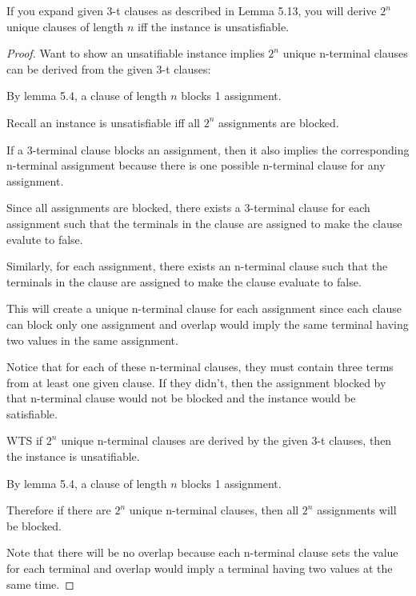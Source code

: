 \documentclass[manuscript]{acmart}
\begin{document}
    \begin{lemma}
        If you expand given 3-t clauses as described in Lemma 5.13, you will
        derive $2^n$ unique clauses of length $n$ iff the instance is unsatisfiable.
    \end{lemma}
    \begin{proof}
        Want to show an unsatifiable instance implies $2^n$ unique n-terminal
        clauses can be derived from the given 3-t clauses:

        By lemma 5.4, a clause of length $n$ blocks 1 assignment. 

        Recall an instance is unsatisfiable iff all $2^n$ assignments are
        blocked.

        If a 3-terminal clause blocks an assignment, then it also implies
        the corresponding n-terminal assignment because there is one possible
        n-terminal clause for any assignment.

        Since all assignments are blocked, there exists a 3-terminal clause for each
        assignment such that the terminals in the clause are assigned to make
        the clause evalute to false.

        Similarly, for each assignment, there exists an n-terminal clause such
        that the terminals in the clause are assigned to make the clause evaluate
        to false.

        This will create a unique n-terminal clause for each assignment since
        each clause can block only one assignment and overlap would imply
        the same terminal having two values in the same assignment.

        Notice that for each of these n-terminal clauses, they must contain
        three terms from at least one given clause. If they didn't, then
        the assignment blocked by that n-terminal clause would not be blocked
        and the instance would be satisfiable.

        WTS if $2^n$ unique n-terminal clauses are derived by the given
        3-t clauses, then the instance is unsatifiable.

        By lemma 5.4, a clause of length $n$ blocks 1 assignment. 

        Therefore if there are $2^n$ unique n-terminal clauses, then
        all $2^n$ assignments will be blocked.

        Note that there will be no overlap because each n-terminal clause
        sets the value for each terminal and overlap would imply a terminal
        having two values at the same time.
    \end{proof}
\end{document}
